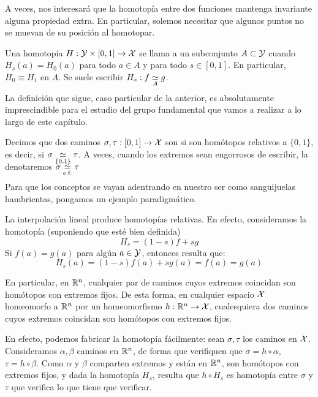 A veces, nos interesará que la homotopía entre dos funciones mantenga invariante alguna propiedad extra. En particular, solemos necesitar que algunos puntos no se muevan de su posición al homotopar.
\begin{defi}
	Una homotopía $H:\Y\times[0,1]\to\X$ se llama  a un subconjunto $A\subset\Y$ cuando $H_s(a)=H_0(a)$ para todo $a\in A$ y para todo $s\in [0,1]$. En particular, $H_0\equiv H_1$ en $A$. Se suele escribir $H_s:f\homot[A]g$.
\end{defi}

La definición que sigue, caso particular de la anterior, es absolutamente imprescindible para el estudio del grupo fundamental que vamos a realizar a lo largo de este capítulo.

\begin{defi}
	Decimos que dos caminos $\sigma,\tau:[0,1]\to\X$ son  si son homótopos relativos a $\{0,1\}$, es decir, si $\sigma\homot[\{0,1\}]\tau$. A veces, cuando los extremos sean engorrosos de escribir, la denotaremos $\sigma\homotef\tau$
\end{defi}
Para que los conceptos se vayan adentrando en nuestro ser como sanguijuelas hambrientas, pongamos un ejemplo paradigmático.
\begin{exa}
	\label{grf_exa_interpolacion}
	La interpolación lineal produce homotopías relativas. En efecto, consideramos la homotopía (suponiendo que esté bien definida)
	\[H_s = (1-s)f + sg\]
	Si $f(a)=g(a)$ para algún $a\in\Y$, entonces resulta que:
	\[H_s(a)=(1-s)f(a)+sg(a)=f(a)=g(a)\]
	
	En particular, en $\R^n$, cualquier par de caminos cuyos extremos coincidan son homótopos con extremos fijos. De esta forma, en cualquier espacio $\X$ homeomorfo a $\R^n$ por un homeomorfismo $h:\R^n\to \X$, cualesquiera dos caminos cuyos extremos coincidan son homótopos con extremos fijos.
	
	En efecto, podemos fabricar la homotopía fácilmente: sean $\sigma,\tau$ los caminos en $\X$. Consideramos $\alpha,\beta$ caminos en $\R^n$, de forma que verifiquen que $\sigma = h\circ\alpha$, $\tau = h\circ\beta$. Como $\alpha$ y $\beta$ comparten extremos y están en $\R^n$, son homótopos con extremos fijos, y dada la homotopía $H_s$, resulta que $h\circ H_s$ es homotopía entre $\sigma$ y $\tau$ que verifica lo que tiene que verificar.
\end{exa}

